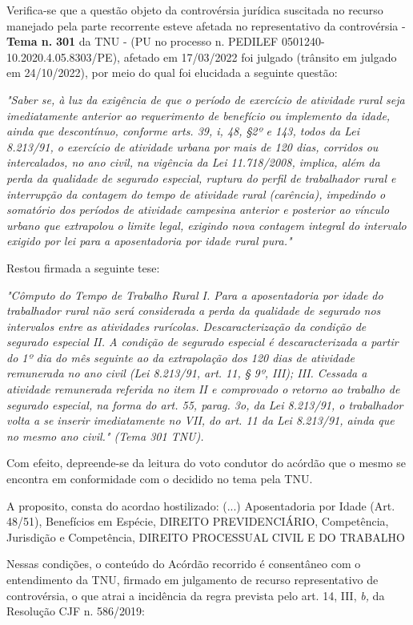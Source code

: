 \documentclass[12pt]{article}
\begin{document}
\justifying
\noindent Verifica-se que a questão objeto da controvérsia jurídica suscitada no recurso manejado pela parte recorrente esteve afetada no representativo da controvérsia - \textbf{Tema n. }\textbf{301} da TNU - (PU no processo n. PEDILEF 0501240-10.2020.4.05.8303/PE),  afetado em 17/03/2022 foi julgado (trânsito em julgado em 24/10/2022), por meio do qual foi elucidada a seguinte questão:

\noindent \textit{"Saber se, à luz da exigência de que o período de exercício de atividade rural seja imediatamente anterior ao requerimento de benefício ou implemento da idade, ainda que descontínuo, conforme arts. 39, i, 48, §2º e 143, todos da Lei 8.213/91, o exercício de atividade urbana por mais de 120 dias, corridos ou intercalados, no ano civil, na vigência da Lei 11.718/2008, implica, além da perda da qualidade de segurado especial, ruptura do perfil de trabalhador rural e interrupção da contagem do tempo de atividade rural (carência), impedindo o somatório dos períodos de atividade campesina anterior e posterior ao vínculo urbano que extrapolou o limite legal, exigindo nova contagem integral do intervalo exigido por lei para a aposentadoria por idade rural pura."}

\noindent Restou firmada a seguinte tese:

\noindent \textit{"Cômputo do Tempo de Trabalho Rural I. Para a aposentadoria por idade do trabalhador rural não será considerada a perda da qualidade de segurado nos intervalos entre as atividades rurícolas. Descaracterização da condição de segurado especial II. A condição de segurado especial é descaracterizada a partir do 1º dia do mês seguinte ao da extrapolação dos 120 dias de atividade remunerada no ano civil (Lei 8.213/91, art. 11, § 9º, III); III. Cessada a atividade remunerada referida no item II e comprovado o retorno ao trabalho de segurado especial, na forma do art. 55, parag. 3o, da Lei 8.213/91, o trabalhador volta a se inserir imediatamente no VII, do art. 11 da Lei 8.213/91, ainda que no mesmo ano civil." (Tema 301 TNU).}

\noindent Com efeito, depreende-se da leitura do voto condutor do acórdão que o mesmo se encontra em conformidade com o decidido no  tema pela TNU.

\noindent A proposito, consta do acordao hostilizado: (...) Aposentadoria por Idade (Art. 48/51), Benefícios em Espécie, DIREITO PREVIDENCIÁRIO, Competência, Jurisdição e Competência, DIREITO PROCESSUAL CIVIL E DO TRABALHO

\noindent Nessas condições, o conteúdo do Acórdão recorrido é consentâneo com o entendimento da TNU, firmado em julgamento de recurso representativo de controvérsia, o que atrai a incidência da regra prevista pelo art. 14, III, \textit{b,} da Resolução CJF n. 586/2019:
\end{document}
